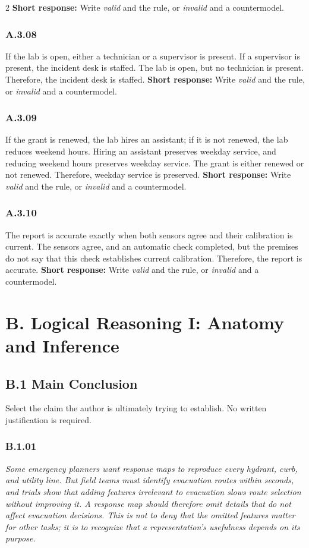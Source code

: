 \documentclass[10pt]{extarticle}
\newcommand{\bankitem}[1]{\subsubsection*{#1}}
\begin{document}
\begin{multicols}{2}
\textbf{Short response:} Write \emph{valid} and the rule, or \emph{invalid} and a countermodel.
\bankitem{A.3.08}
If the lab is open, either a technician or a supervisor is present. If a supervisor is present, the incident desk is staffed. The lab is open, but no technician is present. Therefore, the incident desk is staffed.
\textbf{Short response:} Write \emph{valid} and the rule, or \emph{invalid} and a countermodel.
\bankitem{A.3.09}
If the grant is renewed, the lab hires an assistant; if it is not renewed, the lab reduces weekend hours. Hiring an assistant preserves weekday service, and reducing weekend hours preserves weekday service. The grant is either renewed or not renewed. Therefore, weekday service is preserved.
\textbf{Short response:} Write \emph{valid} and the rule, or \emph{invalid} and a countermodel.
\bankitem{A.3.10}
The report is accurate exactly when both sensors agree and their calibration is current. The sensors agree, and an automatic check completed, but the premises do not say that this check establishes current calibration. Therefore, the report is accurate.
\textbf{Short response:} Write \emph{valid} and the rule, or \emph{invalid} and a countermodel.
\section*{B. Logical Reasoning I: Anatomy and Inference}
\subsection*{B.1 Main Conclusion}
Select the claim the author is ultimately trying to establish. No written justification is required.
\bankitem{B.1.01}
\emph{Some emergency planners want response maps to reproduce every hydrant, curb, and utility line. But field teams must identify evacuation routes within seconds, and trials show that adding features irrelevant to evacuation slows route selection without improving it. A response map should therefore omit details that do not affect evacuation decisions. This is not to deny that the omitted features matter for other tasks; it is to recognize that a representation's usefulness depends on its purpose.}


\end{multicols}
\end{document}
